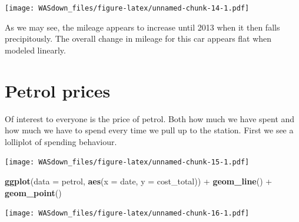 \documentclass[]{book}
\newenvironment{Shaded}{\begin{snugshade}}{\end{snugshade}}
\newcommand{\KeywordTok}[1]{\textcolor[rgb]{0.13,0.29,0.53}{\textbf{{#1}}}}
\newcommand{\DataTypeTok}[1]{\textcolor[rgb]{0.13,0.29,0.53}{{#1}}}
\newcommand{\DecValTok}[1]{\textcolor[rgb]{0.00,0.00,0.81}{{#1}}}
\newcommand{\StringTok}[1]{\textcolor[rgb]{0.31,0.60,0.02}{{#1}}}
\newcommand{\CommentTok}[1]{\textcolor[rgb]{0.56,0.35,0.01}{\textit{{#1}}}}
\newcommand{\NormalTok}[1]{{#1}}
\theoremstyle{definition}
\theoremstyle{definition}
\theoremstyle{remark}
\begin{document}
\texttt{[image: WASdown\_files/figure-latex/unnamed-chunk-14-1.pdf]}

As we may see, the mileage appears to increase until 2013 when it then
falls precipitously. The overall change in mileage for this car appears
flat when modeled linearly.

\section{Petrol prices}\label{petrol-prices}

Of interest to everyone is the price of petrol. Both how much we have
spent and how much we have to spend every time we pull up to the
station. First we see a lolliplot of spending behaviour.

\begin{Shaded}
\end{Shaded}

\texttt{[image: WASdown\_files/figure-latex/unnamed-chunk-15-1.pdf]}

\begin{Shaded}
\begin{Highlighting}[]
\KeywordTok{ggplot}\NormalTok{(}\DataTypeTok{data =} \NormalTok{petrol, }\KeywordTok{aes}\NormalTok{(}\DataTypeTok{x =} \NormalTok{date, }\DataTypeTok{y =} \NormalTok{cost_total)) +}
\StringTok{  }\KeywordTok{geom_line}\NormalTok{() +}
\StringTok{  }\KeywordTok{geom_point}\NormalTok{() }
\end{Highlighting}
\end{Shaded}

\texttt{[image: WASdown\_files/figure-latex/unnamed-chunk-16-1.pdf]}
\end{document}
